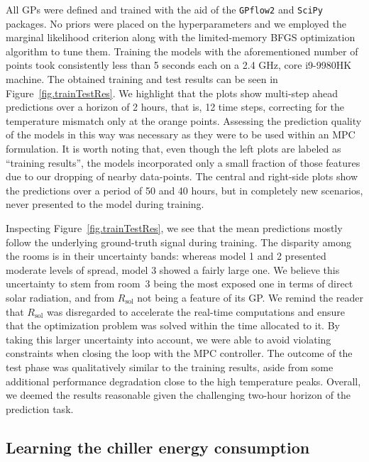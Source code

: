 All GPs were defined and trained with the aid of the \texttt{GPflow2} \cite{gpflow} and \texttt{SciPy} \cite{SciPy} packages. No priors were placed on the hyperparameters and we employed the marginal likelihood criterion along with the limited-memory BFGS optimization algorithm to tune them. Training the models with the aforementioned number of points took consistently less than 5 seconds each on a 2.4 GHz, core i9-9980HK machine. The obtained training and test results can be seen in Figure~\ref{fig.trainTestRes}. We highlight that the plots show multi-step ahead predictions over a horizon of 2 hours, that is, 12 time steps, correcting for the temperature mismatch only at the orange points. Assessing the prediction quality of the models in this way was necessary as they were to be used within an MPC formulation. It is worth noting that, even though the left plots are labeled as ``training results'', the models incorporated only a small fraction of those features due to our dropping of nearby data-points. The central and right-side plots show the predictions over a period of 50 and 40 hours, but in completely new scenarios, never presented to the model during training. 

Inspecting Figure~\ref{fig.trainTestRes}, we see that the mean predictions mostly follow the underlying ground-truth signal during training. The disparity among the rooms is in their uncertainty bands: whereas model 1 and 2 presented moderate levels of spread, model 3 showed a fairly large one. We believe this uncertainty to stem from room~3 being the most exposed one in terms of direct solar radiation, and from $R_\text{sol}$ not being a feature of its GP. We remind the reader that $R_\text{sol}$ was disregarded to accelerate the real-time computations and ensure that the optimization problem was solved within the time allocated to it. By taking this larger uncertainty into account, we were able to avoid violating constraints when closing the loop with the MPC controller. The outcome of the test phase was qualitatively similar to the training results, aside from some additional performance degradation close to the high temperature peaks. Overall, we deemed the results reasonable given the challenging two-hour horizon of the prediction task.

\subsection{Learning the chiller energy consumption}
\label{sec:learningChiller}

